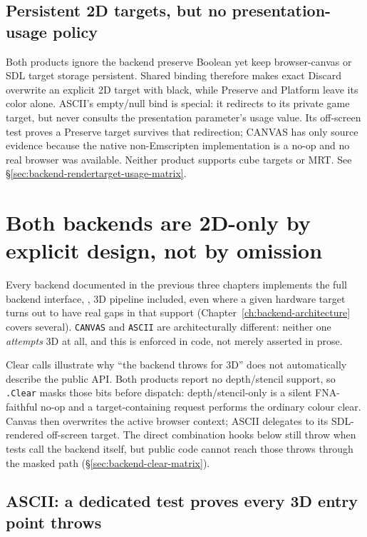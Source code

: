 \subsection{Persistent 2D targets, but no presentation-usage policy}

Both products ignore the backend preserve Boolean yet keep browser-canvas or SDL target
storage persistent. Shared binding therefore makes exact Discard overwrite an explicit 2D
target with black, while Preserve and Platform leave its color alone. ASCII's empty/null bind
is special: it redirects to its private game target, but never consults the presentation
parameter's usage value. Its off-screen test proves a Preserve target survives that redirection;
CANVAS has only source evidence because the native non-Emscripten implementation is a no-op
and no real browser was available. Neither product supports cube targets or MRT. See
\S\ref{sec:backend-rendertarget-usage-matrix}.

\section{Both backends are 2D-only by explicit design, not by omission}

Every backend documented in the previous three chapters implements the full backend interface,
, 3D pipeline included, even where a given hardware
target turns out to have real gaps in that support (Chapter~\ref{ch:backend-architecture}
covers several). \texttt{CANVAS} and \texttt{ASCII} are architecturally different: neither one
\emph{attempts} 3D at all, and this is enforced in code, not merely asserted in prose.

Clear calls illustrate why ``the backend throws for 3D'' does not automatically describe the
public API. Both products report no depth/stencil support, so
\texttt{.Clear} masks those bits before dispatch: depth/stencil-only is
a silent FNA-faithful no-op and a target-containing request performs the ordinary colour clear.
Canvas then overwrites the active browser context; ASCII delegates to its SDL-rendered
off-screen target. The direct combination hooks below still throw when tests call the backend
itself, but public code cannot reach those throws through the masked path
(\S\ref{sec:backend-clear-matrix}).

\subsection{ASCII: a dedicated test proves every 3D entry point throws}


